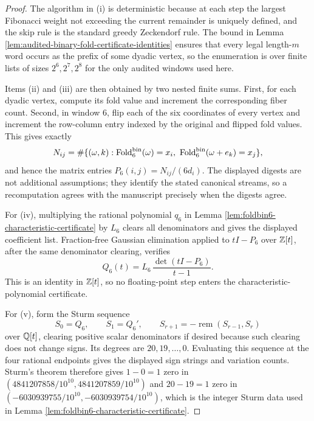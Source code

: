 \begin{proof}
The algorithm in \textup{(i)} is deterministic because at each step the largest Fibonacci weight not exceeding the current remainder is uniquely defined, and the skip rule is the standard greedy Zeckendorf rule.  The bound in Lemma \ref{lem:audited-binary-fold-certificate-identities} ensures that every legal length-\(m\) word occurs as the prefix of some dyadic vertex, so the enumeration is over finite lists of sizes \(2^6,2^7,2^8\) for the only audited windows used here.

Items \textup{(ii)} and \textup{(iii)} are then obtained by two nested finite sums.  First, for each dyadic vertex, compute its fold value and increment the corresponding fiber count.  Second, in window \(6\), flip each of the six coordinates of every vertex and increment the row-column entry indexed by the original and flipped fold values.  This gives exactly
\[
N_{ij}=\#\{(\omega,k):\operatorname{Fold}_6^{\mathrm{bin}}(\omega)=x_i,
\ \operatorname{Fold}_6^{\mathrm{bin}}(\omega+e_k)=x_j\},
\]
and hence the matrix entries \(P_6(i,j)=N_{ij}/(6d_i)\).  The displayed digests are not additional assumptions; they identify the stated canonical streams, so a recomputation agrees with the manuscript precisely when the digests agree.

For \textup{(iv)}, multiplying the rational polynomial \(q_6\) in Lemma \ref{lem:foldbin6-characteristic-certificate} by \(L_6\) clears all denominators and gives the displayed coefficient list.  Fraction-free Gaussian elimination applied to \(tI-P_6\) over \(\mathbb{Z}[t]\), after the same denominator clearing, verifies
\[
Q_6(t)=L_6\,\frac{\det(tI-P_6)}{t-1}.
\]
This is an identity in \(\mathbb{Z}[t]\), so no floating-point step enters the characteristic-polynomial certificate.

For \textup{(v)}, form the Sturm sequence
\[
S_0=Q_6,
\qquad
S_1=Q_6',
\qquad
S_{r+1}=-\operatorname{rem}(S_{r-1},S_r)
\]
over \(\mathbb{Q}[t]\), clearing positive scalar denominators if desired because such clearing does not change signs.  Its degrees are \(20,19,\ldots,0\).  Evaluating this sequence at the four rational endpoints gives the displayed sign strings and variation counts.  Sturm's theorem therefore gives \(1-0=1\) zero in \((4841207858/10^{10},4841207859/10^{10})\) and \(20-19=1\) zero in \((-6030939755/10^{10},-6030939754/10^{10})\), which is the integer Sturm data used in Lemma \ref{lem:foldbin6-characteristic-certificate}.


\end{proof}
